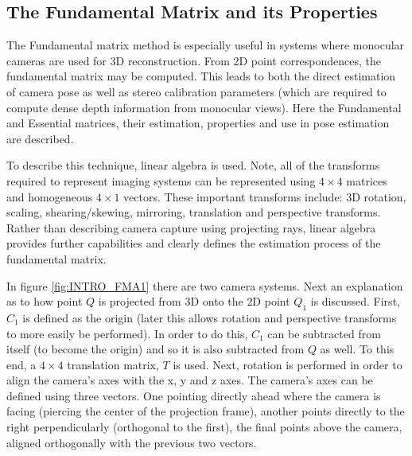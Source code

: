 \subsection{The Fundamental Matrix and its Properties}

\label{FundamentalMatrixSection}

The Fundamental matrix method is especially useful in systems where monocular cameras are used for 3D reconstruction. From 2D point correspondences, the fundamental matrix may be computed. This leads to both the direct estimation of camera pose as well as stereo calibration parameters (which are required to compute dense depth information from monocular views). Here the Fundamental and Essential matrices, their estimation, properties and use in pose estimation are described.

To describe this technique, linear algebra is used. Note, all of the transforms required to represent imaging systems can be represented using $4 \times 4$ matrices and homogeneous $4 \times 1$ vectors. These important transforms include: 3D rotation, scaling, shearing/skewing, mirroring, translation and perspective transforms. Rather than describing camera capture using projecting rays, linear algebra provides further capabilities and clearly defines the estimation process of the fundamental matrix. 

In figure \ref{fig:INTRO_FMA1} there are two camera systems. Next an explanation as to how point $Q$ is projected from 3D onto the 2D point $Q_{1}$ is discussed. First, $C_{1}$ is defined as the origin (later this allows rotation and perspective transforms to more easily be performed). In order to do this, $C_{1}$ can be subtracted from itself (to become the origin) and so it is also subtracted from $Q$ as well. To this end, a $4 \times 4$ translation matrix, $T$ is used. Next, rotation is performed in order to align the camera's axes with the x, y and z axes. The camera's axes can be defined using three vectors. One pointing directly ahead where the camera is facing (piercing the center of the projection frame), another points directly to the right perpendicularly (orthogonal to the first), the final points above the camera, aligned orthogonally with the previous two vectors. \\

